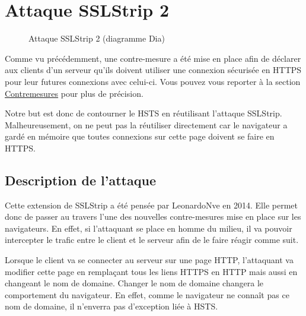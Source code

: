\chapter{Attaque SSLStrip 2}

\label{sec:sslstrip2}

\begin{figure}[H]
  \caption{Attaque SSLStrip 2 (diagramme Dia)}
\end{figure}

Comme vu précédemment, une contre-mesure a été mise en place afin de déclarer aux clients d'un serveur qu'ils doivent utiliser une connexion sécurisée en HTTPS pour leur futures connexions avec celui-ci. Vous pouvez vous reporter à la section \hyperref[sec:hsts]{Contremesures} pour plus de précision.

Notre but est donc de contourner le HSTS en réutilisant l'attaque SSLStrip. Malheureusement, on ne peut pas la réutiliser directement car le navigateur a gardé en mémoire que toutes connexions sur cette page doivent se faire en HTTPS.

\section{Description de l'attaque}
Cette extension de SSLStrip a été pensée par LeonardoNve en 2014. Elle permet donc de passer au travers l'une des nouvelles contre-mesures mise en place sur les navigateurs. En effet, si l'attaquant se place en homme du milieu, il va pouvoir intercepter le trafic entre le client et le serveur afin de le faire réagir comme suit.

Lorsque le client va se connecter au serveur sur une page HTTP, l'attaquant va modifier cette page en remplaçant tous les liens HTTPS en HTTP mais aussi en changeant le nom de domaine. Changer le nom de domaine changera le comportement du navigateur. En effet, comme le navigateur ne connaît pas ce nom de domaine, il n'enverra pas d'exception liée à HSTS.

